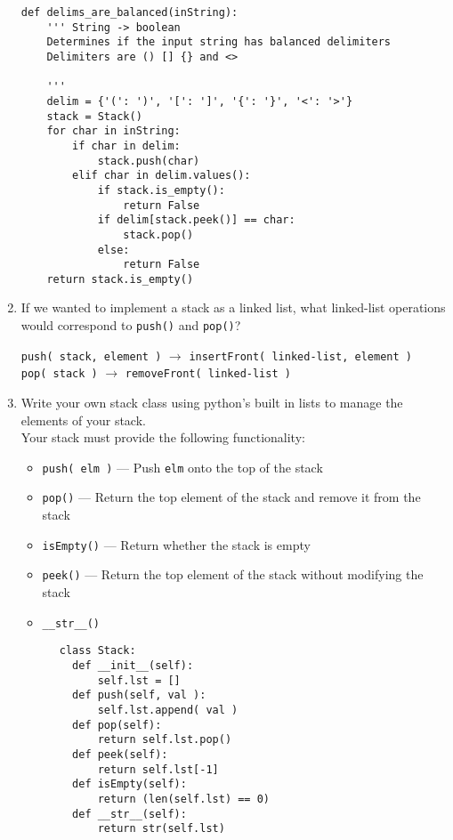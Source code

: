 \documentclass[11pt]{article}
\newenvironment{answer}{\large\lstset{basicstyle=\large}\color{white}}{}
\newenvironment{answer}{\large\lstset{basicstyle=\large}\color{red}}{}
\begin{document}
\begin{enumerate}
    \begin{answer}
    \begin{lstlisting} 
def delims_are_balanced(inString):
    ''' String -> boolean
    Determines if the input string has balanced delimiters
    Delimiters are () [] {} and <>  
    
    '''
    delim = {'(': ')', '[': ']', '{': '}', '<': '>'}
    stack = Stack()
    for char in inString:
        if char in delim:
            stack.push(char)
        elif char in delim.values():
            if stack.is_empty():
                return False
            if delim[stack.peek()] == char:
                stack.pop()
            else:
                return False
    return stack.is_empty()
    \end{lstlisting}
    \end{answer}
\vspace{1.5in}

\item If we wanted to implement a stack as a linked list, what linked-list
	operations would correspond to \texttt{push()} and \texttt{pop()}?

	\begin{answer}
	\texttt{push( stack, element )} $\rightarrow$ \texttt{insertFront( linked-list, element )} \\
	\texttt{pop( stack )} $\rightarrow$ \texttt{removeFront( linked-list )}
	\end{answer}

	
\pagebreak
\item Write your own stack class using python's built in lists to manage the elements of your stack. \\
Your stack must provide the following functionality:
	  \begin{itemize}
	  \item []\texttt{push( elm )} --- Push \texttt{elm} onto the top of the stack
	  \item []\texttt{pop()} --- Return the top element of the stack and remove it from the stack
	  \item []\texttt{isEmpty()} --- Return whether the stack is empty
	  \item []\texttt{peek()} --- Return the top element of the stack without modifying the stack 
	  \item []\texttt{\_\_str\_\_()}
	  \end{itemize}
	  \begin{answer}
	  \begin{lstlisting}
	  class Stack:
		def __init__(self):
			self.lst = []
		def push(self, val ):
			self.lst.append( val )
		def pop(self):
			return self.lst.pop()
		def peek(self):
			return self.lst[-1]
		def isEmpty(self):
			return (len(self.lst) == 0)
		def __str__(self):
			return str(self.lst)
			  \end{lstlisting}
	  \end{answer}
	  \vspace{0.5in}


\end{enumerate}
\end{document}
